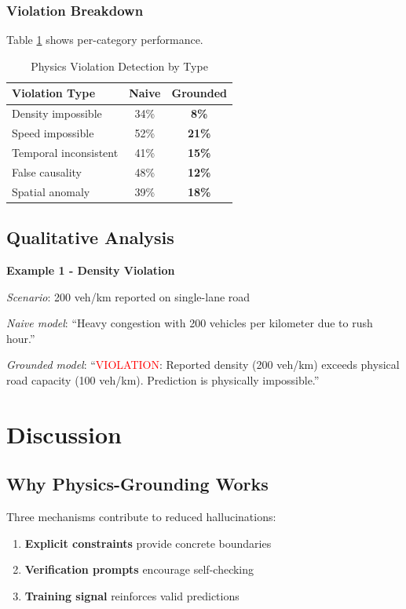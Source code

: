 \documentclass[conference]{IEEEtran}
\begin{document}
\subsubsection{Violation Breakdown}

Table \ref{tab:violations} shows per-category performance.

\begin{table}[h]
\centering
\caption{Physics Violation Detection by Type}
\label{tab:violations}
\begin{tabular}{lcc}
\toprule
\textbf{Violation Type} & \textbf{Naive} & \textbf{Grounded} \\
\midrule
Density impossible & 34\% & \textbf{8\%} \\
Speed impossible & 52\% & \textbf{21\%} \\
Temporal inconsistent & 41\% & \textbf{15\%} \\
False causality & 48\% & \textbf{12\%} \\
Spatial anomaly & 39\% & \textbf{18\%} \\
\bottomrule
\end{tabular}
\end{table}

\subsection{Qualitative Analysis}

\textbf{Example 1 - Density Violation}

\emph{Scenario}: 200 veh/km reported on single-lane road

\emph{Naive model}: ``Heavy congestion with 200 vehicles per kilometer due to rush hour.''

\emph{Grounded model}: ``\textcolor{red}{VIOLATION}: Reported density (200 veh/km) exceeds physical road capacity (100 veh/km). Prediction is physically impossible.''

\section{Discussion}

\subsection{Why Physics-Grounding Works}

Three mechanisms contribute to reduced hallucinations:

\begin{enumerate}
    \item \textbf{Explicit constraints} provide concrete boundaries
    \item \textbf{Verification prompts} encourage self-checking
    \item \textbf{Training signal} reinforces valid predictions
\end{enumerate}
\end{document}
